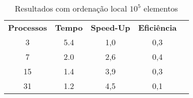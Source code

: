 \begin{table}[h!]
\centering
\caption{Resultados com ordenação local $10^5$ elementos}
\label{table:optimized-100k}
\begin{tabular}{ccccc}
 \textbf{Processos} & \textbf{Tempo} & \textbf{Speed-Up} & \textbf{Eficiência} \\
 3                & 5.4            & 1,0               & 0,3                 \\
 7                & 2.0            & 2,6               & 0,4                 \\
 15               & 1.4            & 3,9               & 0,3                 \\
 31               & 1.2            & 4,5               & 0,1                
\end{tabular}
\end{table}